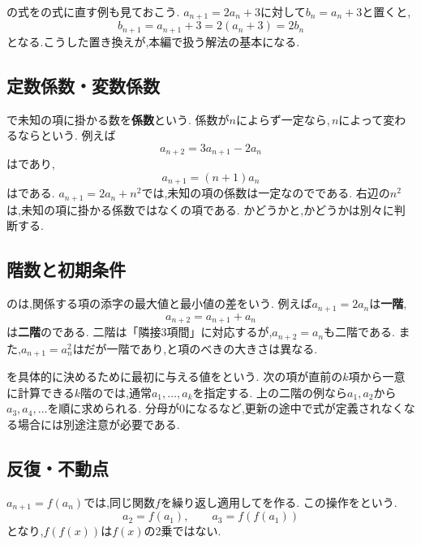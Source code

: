     の式をの式に直す例も見ておこう.
    $a_{n+1}=2a_n+3$に対して$b_n=a_n+3$と置くと,
    \[
      b_{n+1}=a_{n+1}+3=2(a_n+3)=2b_n
    \]
    となる.こうした置き換えが,本編で扱う解法の基本になる.

  \subsection{定数係数・変数係数}\label{節：定数係数・変数係数}
    で未知の項に掛かる数を\textbf{係数}という.
    係数が$n$によらず一定なら\textbf{},\,$n$によって変わるなら\textbf{}という.
    例えば
    \[
      a_{n+2}=3a_{n+1}-2a_n
    \]
    はであり,
    \[
      a_{n+1}=(n+1)a_n
    \]
    はである.
    $a_{n+1}=2a_n+n^2$では,未知の項の係数は一定なのでである.
    右辺の$n^2$は,未知の項に掛かる係数ではなくの項である.
    かどうかと,かどうかは別々に判断する.

  \subsection{階数と初期条件}\label{節：階数と初期条件}
    の\textbf{}は,関係する項の添字の最大値と最小値の差をいう.
    例えば$a_{n+1}=2a_n$は\textbf{一階},
    \[
      a_{n+2}=a_{n+1}+a_n
    \]
    は\textbf{二階}のである.
    二階は「隣接3項間」に対応するが,$a_{n+2}=a_n$も二階である.
    また,$a_{n+1}=a_n^2$はだが一階であり,と項のべきの大きさは異なる.

    を具体的に決めるために最初に与える値を\textbf{}という.
    次の項が直前の$k$項から一意に計算できる$k$階のでは,通常$a_1,\ldots,a_k$を指定する.
    上の二階の例なら$a_1,a_2$から$a_3,a_4,\ldots$を順に求められる.
    分母が$0$になるなど,更新の途中で式が定義されなくなる場合には別途注意が必要である.

  \subsection{反復・不動点}\label{節：反復・不動点}
    $a_{n+1}=f(a_n)$では,同じ関数$f$を繰り返し適用してを作る.
    この操作を\textbf{}という.
    \[
      a_2=f(a_1),\qquad a_3=f(f(a_1))
    \]
    となり,$f(f(x))$は$f(x)$の2乗ではない.

